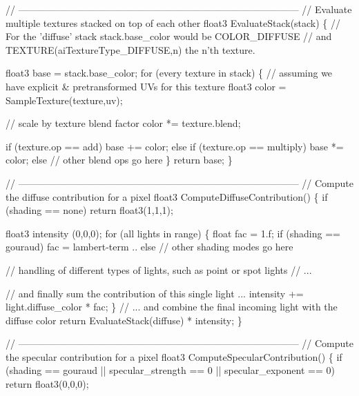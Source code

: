 \begin{DoxyCode}
\textcolor{comment}{// ---------------------------------------------------------------------------------------}
\textcolor{comment}{// Evaluate multiple textures stacked on top of each other}
float3 EvaluateStack(stack)
\{
  \textcolor{comment}{// For the 'diffuse' stack stack.base\_color would be COLOR\_DIFFUSE}
  \textcolor{comment}{// and TEXTURE(aiTextureType\_DIFFUSE,n) the n'th texture.}

  float3 base = stack.base\_color;
  \textcolor{keywordflow}{for} (every texture in stack)
  \{
    \textcolor{comment}{// assuming we have explicit & pretransformed UVs for this texture}
    float3 color = SampleTexture(texture,uv); 

    \textcolor{comment}{// scale by texture blend factor}
    color *= texture.blend;

    \textcolor{keywordflow}{if} (texture.op == add)
      base += color;
    \textcolor{keywordflow}{else} \textcolor{keywordflow}{if} (texture.op == multiply)
      base *= color;
    \textcolor{keywordflow}{else} \textcolor{comment}{// other blend ops go here}
  \}
  \textcolor{keywordflow}{return} base;
\}

\textcolor{comment}{// ---------------------------------------------------------------------------------------}
\textcolor{comment}{// Compute the diffuse contribution for a pixel}
float3 ComputeDiffuseContribution()
\{
  \textcolor{keywordflow}{if} (shading == none)
     \textcolor{keywordflow}{return} float3(1,1,1);

  float3 intensity (0,0,0);
  \textcolor{keywordflow}{for} (all lights in range)
  \{
    \textcolor{keywordtype}{float} fac = 1.f;
    \textcolor{keywordflow}{if} (shading == gouraud)
      fac =  lambert-term ..
    \textcolor{keywordflow}{else} \textcolor{comment}{// other shading modes go here}

    \textcolor{comment}{// handling of different types of lights, such as point or spot lights}
    \textcolor{comment}{// ...}

    \textcolor{comment}{// and finally sum the contribution of this single light ...}
    intensity += light.diffuse\_color * fac;
  \}
  \textcolor{comment}{// ... and combine the final incoming light with the diffuse color}
  \textcolor{keywordflow}{return} EvaluateStack(diffuse) * intensity;
\}

\textcolor{comment}{// ---------------------------------------------------------------------------------------}
\textcolor{comment}{// Compute the specular contribution for a pixel}
float3 ComputeSpecularContribution()
\{
  \textcolor{keywordflow}{if} (shading == gouraud || specular\_strength == 0 || specular\_exponent == 0)
    \textcolor{keywordflow}{return} float3(0,0,0);


\end{DoxyCode}
